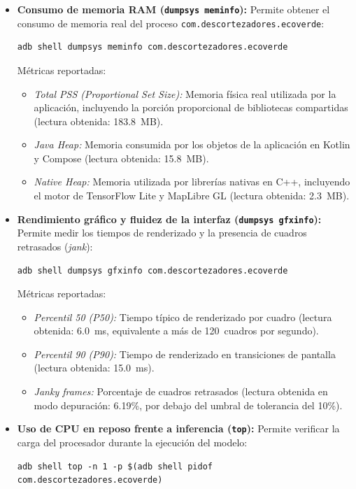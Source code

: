 \begin{itemize}
    \item \textbf{Consumo de memoria RAM (\texttt{dumpsys meminfo}):}
    Permite obtener el consumo de memoria real del proceso \texttt{com.descortezadores.ecoverde}:
\begin{verbatim}
adb shell dumpsys meminfo com.descortezadores.ecoverde
\end{verbatim}
    Métricas reportadas:
    \begin{itemize}
        \item \textit{Total PSS (Proportional Set Size):} Memoria física real utilizada por la aplicación, incluyendo la porción proporcional de bibliotecas compartidas (lectura obtenida: 183.8~MB).
        \item \textit{Java Heap:} Memoria consumida por los objetos de la aplicación en Kotlin y Compose (lectura obtenida: 15.8~MB).
        \item \textit{Native Heap:} Memoria utilizada por librerías nativas en C++, incluyendo el motor de TensorFlow Lite y MapLibre GL (lectura obtenida: 2.3~MB).
    \end{itemize}

    \item \textbf{Rendimiento gráfico y fluidez de la interfaz (\texttt{dumpsys gfxinfo}):}
    Permite medir los tiempos de renderizado y la presencia de cuadros retrasados (\textit{jank}):
\begin{verbatim}
adb shell dumpsys gfxinfo com.descortezadores.ecoverde
\end{verbatim}
    Métricas reportadas:
    \begin{itemize}
        \item \textit{Percentil 50 (P50):} Tiempo típico de renderizado por cuadro (lectura obtenida: 6.0~ms, equivalente a más de 120~cuadros por segundo).
        \item \textit{Percentil 90 (P90):} Tiempo de renderizado en transiciones de pantalla (lectura obtenida: 15.0~ms).
        \item \textit{Janky frames:} Porcentaje de cuadros retrasados (lectura obtenida en modo depuración: 6.19\%, por debajo del umbral de tolerancia del 10\%).
    \end{itemize}

    \item \textbf{Uso de CPU en reposo frente a inferencia (\texttt{top}):}
    Permite verificar la carga del procesador durante la ejecución del modelo:
\begin{verbatim}
adb shell top -n 1 -p $(adb shell pidof com.descortezadores.ecoverde)
\end{verbatim}
\end{itemize}


